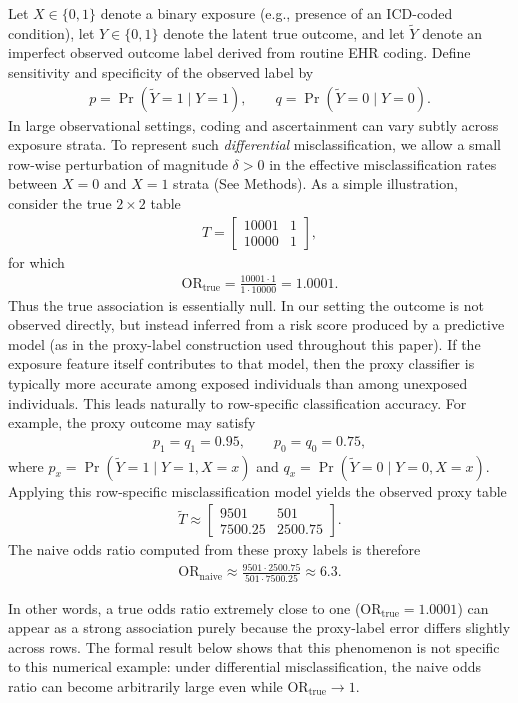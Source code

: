 \documentclass[pdflatex,sn-mathphys-num]{sn-jnl}%
\def\EQSP{3pt}
\newcommand{\cgather}[2][\EQSP]{\begingroup\setlength\abovedisplayskip{#1}\setlength\belowdisplayskip{#1}\begin{gather} #2 \end{gather}\endgroup\noindent}
\theoremstyle{thmstyleone}%
\theoremstyle{thmstyletwo}%
\theoremstyle{thmstylethree}%
\begin{document}
Let $X\in\{0,1\}$ denote a binary exposure (e.g., presence of an ICD-coded condition), let $Y\in\{0,1\}$ denote the latent true outcome, and let $\widetilde Y$ denote an imperfect observed outcome label derived from routine EHR coding. Define sensitivity and specificity of the observed label by
\cgather{\label{eq1}
p=\Pr(\widetilde Y=1\mid Y=1),\qquad q=\Pr(\widetilde Y=0\mid Y=0).
}
In large observational settings, coding and ascertainment can vary subtly across exposure strata. To represent such \emph{differential} misclassification, we allow a small row-wise perturbation of magnitude $\delta>0$ in the effective misclassification rates between $X=0$ and $X=1$ strata (See Methods). 
As a simple illustration, consider the true \(2\times2\) table
\cgather{
T=
\begin{bmatrix}
10001 & 1\\
10000 & 1
\end{bmatrix},
}
for which
\cgather{
\mathrm{OR}_{\mathrm{true}}
=
\frac{10001\cdot 1}{1\cdot 10000}
=
1.0001.
}
Thus the true association is essentially null. In our setting the outcome is not observed directly, but instead inferred from a risk score produced by a predictive model (as in the proxy-label construction used throughout this paper). If the exposure feature itself contributes to that model, then the proxy classifier is typically more accurate among exposed individuals than among unexposed individuals. This leads naturally to row-specific classification accuracy. For example, the proxy outcome may satisfy
\cgather{
p_1= q_1=0.95,
\qquad
p_0=q_0=0.75,
}
where \(p_x=\Pr(\tilde Y=1\mid Y=1,X=x)\) and
\(q_x=\Pr(\tilde Y=0\mid Y=0,X=x)\).
Applying this row-specific misclassification model yields the observed proxy table
\cgather{
\tilde T \approx
\begin{bmatrix}
9501 & 501\\
7500.25 & 2500.75
\end{bmatrix}.
}
The naive odds ratio computed from these proxy labels is therefore
\cgather{
\mathrm{OR}_{\mathrm{naive}}
\approx
\frac{9501\cdot 2500.75}{501\cdot 7500.25}
\approx 6.3.
}

In other words, a true odds ratio extremely close to one
(\(\mathrm{OR}_{\mathrm{true}}=1.0001\))
can appear as a strong association purely because the proxy-label error differs slightly across rows. The formal result below shows that this phenomenon is not specific to this numerical example: under differential misclassification, the naive odds ratio can become arbitrarily large even while \(\mathrm{OR}_{\mathrm{true}}\to 1\).
\end{document}
